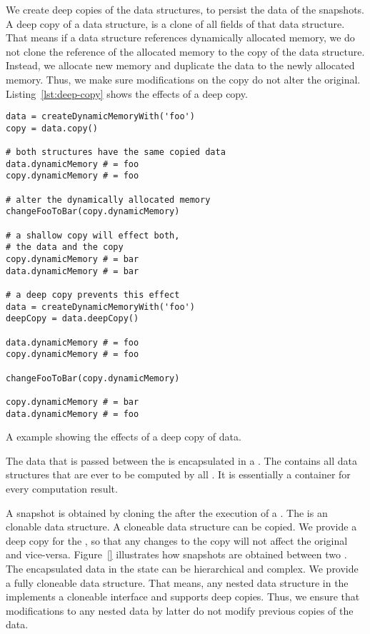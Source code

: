 \documentclass[../ClassicThesis.tex]{subfiles}
\begin{document}
We create deep copies of the data structures, to persist the
data of the snapshots. A deep copy of a data structure, is a
clone of all fields of that data structure. That means if a
data structure references dynamically allocated memory, we
do not clone the reference of the allocated memory to the
copy of the data structure. Instead, we allocate new memory
and duplicate the data to the newly allocated memory. Thus,
we make sure modifications on the copy do not alter the
original. Listing~\ref{lst:deep-copy} shows the effects of a
deep copy.

\begin{listing}[h]
\begin{verbatim}
data = createDynamicMemoryWith('foo')
copy = data.copy()

# both structures have the same copied data
data.dynamicMemory # = foo
copy.dynamicMemory # = foo

# alter the dynamically allocated memory
changeFooToBar(copy.dynamicMemory)

# a shallow copy will effect both,
# the data and the copy
copy.dynamicMemory # = bar
data.dynamicMemory # = bar

# a deep copy prevents this effect
data = createDynamicMemoryWith('foo')
deepCopy = data.deepCopy()

data.dynamicMemory # = foo
copy.dynamicMemory # = foo

changeFooToBar(copy.dynamicMemory)

copy.dynamicMemory # = bar
data.dynamicMemory # = foo
\end{verbatim}
\caption{A {\coffeescript} example showing the effects of a deep copy
  of data.}
\label{lst:deep-copy}
\end{listing}


The data that is passed between the  is
encapsulated in a . The
 contains all data structures that are
ever to be computed by all . It is
essentially a container for every computation result.

A snapshot is obtained by cloning the 
after the execution of a . The
 is an clonable data structure. A
cloneable data structure can be copied. We provide a deep
copy for the , so that any changes to
the copy will not affect the original and vice-versa.
Figure~\ref{}  illustrates
how snapshots are obtained between two
. The encapsulated data in the state
can be hierarchical and complex. We provide a fully
cloneable data structure. That means, any nested data
structure in the  implements a
cloneable interface and supports deep copies. Thus, we
ensure that modifications to any nested data by latter
 do not modify previous copies of the
data.
\end{document}
